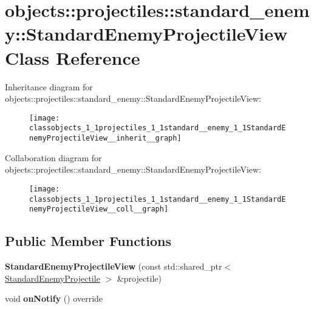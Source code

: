 \hypertarget{classobjects_1_1projectiles_1_1standard__enemy_1_1StandardEnemyProjectileView}{}\section{objects\+:\+:projectiles\+:\+:standard\+\_\+enemy\+:\+:Standard\+Enemy\+Projectile\+View Class Reference}
\label{classobjects_1_1projectiles_1_1standard__enemy_1_1StandardEnemyProjectileView}


Inheritance diagram for objects\+:\+:projectiles\+:\+:standard\+\_\+enemy\+:\+:Standard\+Enemy\+Projectile\+View\+:\nopagebreak
\begin{figure}[H]
\begin{center}
\leavevmode
\texttt{[image: classobjects\_1\_1projectiles\_1\_1standard\_\_enemy\_1\_1StandardEnemyProjectileView\_\_inherit\_\_graph]}
\end{center}
\end{figure}


Collaboration diagram for objects\+:\+:projectiles\+:\+:standard\+\_\+enemy\+:\+:Standard\+Enemy\+Projectile\+View\+:\nopagebreak
\begin{figure}[H]
\begin{center}
\leavevmode
\texttt{[image: classobjects\_1\_1projectiles\_1\_1standard\_\_enemy\_1\_1StandardEnemyProjectileView\_\_coll\_\_graph]}
\end{center}
\end{figure}
\subsection*{Public Member Functions}
\begin{DoxyCompactItemize}
\item 
\mbox{\label{classobjects_1_1projectiles_1_1standard__enemy_1_1StandardEnemyProjectileView_a427269c9aa0e8b59e424dda56e8bb3cd}}
{\bfseries Standard\+Enemy\+Projectile\+View} (const std\+::shared\+\_\+ptr$<$ \hyperlink{classobjects_1_1projectiles_1_1standard__enemy_1_1StandardEnemyProjectile}{Standard\+Enemy\+Projectile} $>$ \&projectile)
\item 
\mbox{\label{classobjects_1_1projectiles_1_1standard__enemy_1_1StandardEnemyProjectileView_a25fd3839b1dc9964fd256650a82c8237}}
void {\bfseries on\+Notify} () override
\end{DoxyCompactItemize}
